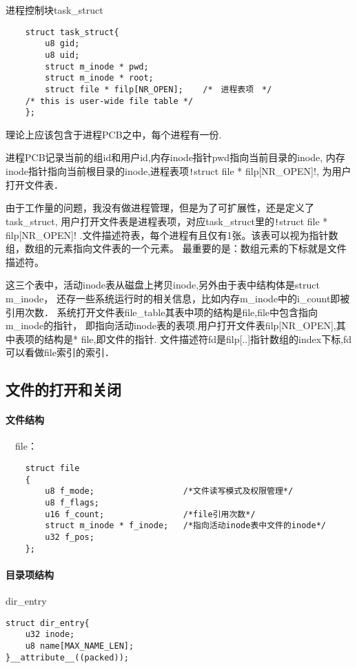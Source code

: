 进程控制块task\_struct
\begin{verbatim}
	struct task_struct{
		u8 gid;
		u8 uid;
		struct m_inode * pwd;
		struct m_inode * root;
		struct file * filp[NR_OPEN];	/*　进程表项　*/
	/* this is user-wide file table */	
	};	   
\end{verbatim}

理论上应该包含于进程PCB之中，每个进程有一份.

进程PCB记录当前的组id和用户id,内存inode指针pwd指向当前目录的inode,
内存inode指针指向当前根目录的inode,进程表项\texttt!struct file * filp[NR_OPEN]!,
为用户打开文件表．

由于工作量的问题，我没有做进程管理，但是为了可扩展性，还是定义了task\_struct,
用户打开文件表是进程表项，对应task\_struct里的\texttt!struct file * filp[NR_OPEN]!
.文件描述符表，每个进程有且仅有1张。该表可以视为指针数组，数组的元素指向文件表的一个元素。
最重要的是：数组元素的下标就是文件描述符。

这三个表中，活动inode表从磁盘上拷贝inode,另外由于表中结构体是struct m\_inode，
还存一些系统运行时的相关信息，比如内存m\_inode中的i\_count即被引用次数．
系统打开文件表file\_table其表中项的结构是file,file中包含指向m\_inode的指针，
即指向活动inode表的表项.用户打开文件表filp[NR\_OPEN],其中表项的结构是* file,即文件的指针.
文件描述符fd是filp[..]指针数组的index下标,fd可以看做file索引的索引．



\subsection{文件的打开和关闭}

\paragraph{文件结构}　file：

\begin{verbatim}
	struct file
	{
		u8 f_mode;			        /*文件读写模式及权限管理*/
		u8 f_flags;
		u16 f_count;			    /*file引用次数*/
		struct m_inode * f_inode;	/*指向活动inode表中文件的inode*/
		u32 f_pos;
	};	
\end{verbatim}

\paragraph{目录项结构} dir\_entry

\begin{verbatim}
struct dir_entry{
	u32 inode;
	u8 name[MAX_NAME_LEN];
}__attribute__((packed));
\end{verbatim}


